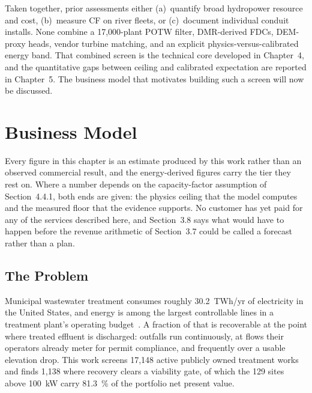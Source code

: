 \documentclass[12pt,letterpaper]{report}
\begin{document}
Taken together, prior assessments either (a)~quantify broad hydropower resource and cost,
(b)~measure CF on river fleets, or (c)~document individual conduit installs. None combine a
17,000-plant POTW filter, DMR-derived FDCs, DEM-proxy heads, vendor turbine matching, and
an explicit physics-versus-calibrated energy band. That combined screen is the technical
core developed in Chapter~4, and the quantitative gaps between ceiling and calibrated
expectation are reported in Chapter~5. The business model that motivates building such a
screen will now be discussed.

\chapter{Business Model}

Every figure in this chapter is an estimate produced by this work rather than an
observed commercial result, and the energy-derived figures carry the tier they rest
on. Where a number depends on the capacity-factor assumption of Section~4.4.1, both
ends are given: the physics ceiling that the model computes and the measured floor
that the evidence supports. No customer has yet paid for any of the services
described here, and Section~3.8 says what would have to happen before the revenue
arithmetic of Section~3.7 could be called a forecast rather than a plan.

\section{The Problem}

Municipal wastewater treatment consumes roughly 30.2~TWh/yr of electricity in the
United States, and energy is among the largest controllable lines in a treatment
plant's operating budget~\cite{epri2013,epa2013}. A fraction of that is
recoverable at the point where treated effluent is discharged: outfalls run
continuously, at flows their operators already meter for permit compliance, and
frequently over a usable elevation drop. This work screens 17,148 active publicly
owned treatment works and finds 1,138 where recovery clears a viability gate, of
which the 129 sites above 100~kW carry 81.3~\% of the portfolio net present value.
\end{document}
